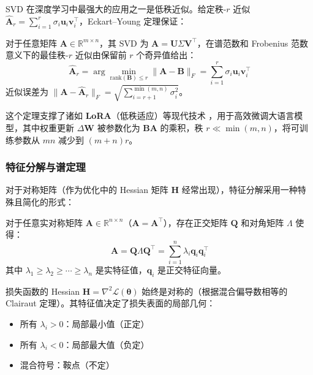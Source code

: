 SVD 在深度学习中最强大的应用之一是低秩近似。给定秩-$r$ 近似 $\hat{\mathbf{A}}_r = \sum_{i=1}^{r} \sigma_i \mathbf{u}_i \mathbf{v}_i^\top$，Eckart--Young 定理保证：

\begin{定理}
对于任意矩阵 $\mathbf{A} \in \mathbb{R}^{m \times n}$，其 SVD 为 $\mathbf{A} = \mathbf{U}\Sigma\mathbf{V}^\top$，在谱范数和 Frobenius 范数意义下的最佳秩-$r$ 近似由保留前 $r$ 个奇异值给出：
\begin{equation}
\hat{\mathbf{A}}_r = \arg\min_{\text{rank}(\mathbf{B}) \leq r} \|\mathbf{A} - \mathbf{B}\|_F = \sum_{i=1}^{r} \sigma_i \mathbf{u}_i \mathbf{v}_i^\top
\end{equation}
近似误差为 $\|\mathbf{A} - \hat{\mathbf{A}}_r\|_F = \sqrt{\sum_{i=r+1}^{\min(m,n)} \sigma_i^2}$。
\end{定理}

这个定理支撑了诸如 \textbf{LoRA}（低秩适应）等现代技术 \cite{hu2021lora}，用于高效微调大语言模型，其中权重更新 $\Delta\mathbf{W}$ 被参数化为 $\mathbf{B}\mathbf{A}$ 的乘积，秩 $r \ll \min(m, n)$，将可训练参数从 $mn$ 减少到 $(m + n)r$。

\subsubsection{特征分解与谱定理}

对于对称矩阵（作为优化中的 Hessian 矩阵 $\mathbf{H}$ 经常出现），特征分解采用一种特殊且简化的形式：

\begin{定理}[谱定理]
对于任意实对称矩阵 $\mathbf{A} \in \mathbb{R}^{n \times n}$（$\mathbf{A} = \mathbf{A}^\top$），存在正交矩阵 $\mathbf{Q}$ 和对角矩阵 $\Lambda$ 使得：
\begin{equation}
\mathbf{A} = \mathbf{Q}\Lambda\mathbf{Q}^\top = \sum_{i=1}^{n} \lambda_i \mathbf{q}_i \mathbf{q}_i^\top
\end{equation}
其中 $\lambda_1 \geq \lambda_2 \geq \cdots \geq \lambda_n$ 是实特征值，$\mathbf{q}_i$ 是正交特征向量。
\end{定理}

损失函数的 Hessian $\mathbf{H} = \nabla^2 \mathcal{L}(\boldsymbol{\theta})$ 始终是对称的（根据混合偏导数相等的 Clairaut 定理）。其特征值决定了损失表面的局部几何：
\begin{itemize}
    \item 所有 $\lambda_i > 0$：局部最小值（正定）
    \item 所有 $\lambda_i < 0$：局部最大值（负定）
    \item 混合符号：鞍点（不定）
\end{itemize}

